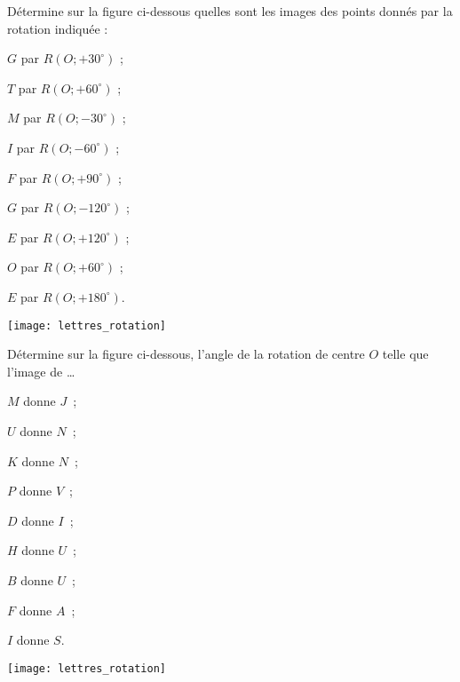

\begin{exercice}
Détermine sur la figure ci-dessous quelles sont les images des points donnés par la rotation indiquée :
\begin{colenumerate}{2}
 \item $G$ par $R(O ; + 30^\circ)$ ;
 \item $T$ par $R(O ; + 60^\circ)$ ;
 \item $M$ par $R(O ; - 30^\circ)$ ;
 \item $I$ par $R(O ; - 60^\circ)$ ;
 \item $F$ par $R(O ; + 90^\circ)$ ;
 \item $G$ par $R(O ; - 120^\circ)$ ;
 \item $E$ par $R(O; + 120^\circ)$ ;
 \item $O$ par $R(O ; + 60^\circ)$ ;
 \item $E$ par $R(O ; + 180^\circ)$.
 \end{colenumerate}
\begin{center} \texttt{[image: lettres\_rotation]} \end{center}
\end{exercice}

\newpage

\vspace{-2.5cm}
\begin{exercice}
Détermine sur la figure ci-dessous, l'angle de la rotation de centre $O$ telle que l'image de \ldots
\begin{colenumerate}{3}
 \item $M$ donne $J$ ;
 \item $U$ donne $N$ ;
 \item $K$ donne $N$ ;
 \item $P$ donne $V$ ;
 \item $D$ donne $I$ ;
 \item $H$ donne $U$ ;
 \item $B$ donne $U$ ;
 \item $F$ donne $A$ ;
 \item $I$ donne $S$.
 \end{colenumerate}
\begin{center} \texttt{[image: lettres\_rotation]} \end{center}
\end{exercice}



